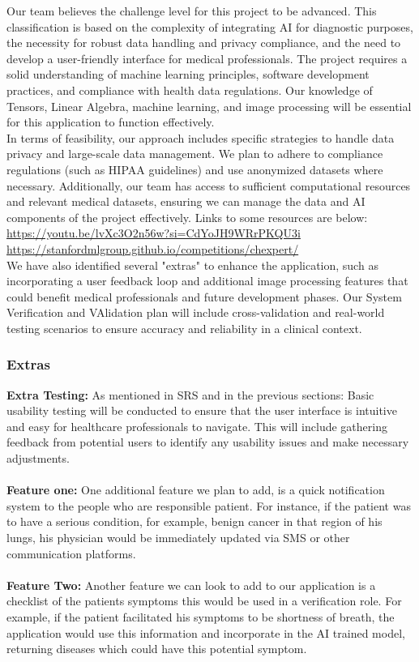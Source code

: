 \documentclass[12pt, titlepage]{article}
\begin{document}
Our team believes the challenge level for this project to be advanced. This classification is based on the complexity of integrating AI for diagnostic purposes, the necessity for robust data handling and privacy compliance, and the need to develop a user-friendly interface for medical professionals. The project requires a solid understanding of machine learning principles, software development practices, and compliance with health data regulations. Our knowledge of Tensors, Linear Algebra, machine learning, and image processing will be essential for this application to function effectively. \\
In terms of feasibility, our approach includes specific strategies to handle data privacy and large-scale data management. We plan to adhere to compliance regulations (such as HIPAA guidelines) and use anonymized datasets where necessary. Additionally, our team has access to sufficient computational resources and relevant medical datasets, ensuring we can manage the data and AI components of the project effectively. Links to some resources are below:\\
\url{https://youtu.be/lvXc3O2n56w?si=CdYoJH9WRrPKQU3i}
\url{https://stanfordmlgroup.github.io/competitions/chexpert/} \\ 
We have also identified several "extras" to enhance the application, such as incorporating a user feedback loop and additional image processing features that could benefit medical professionals and future development phases. Our System Verification and VAlidation plan will include cross-validation and real-world testing scenarios to ensure accuracy and reliability in a clinical context. \\
\subsubsection{Extras}

\textbf{Extra Testing:}
As mentioned in SRS and in the previous sections: Basic usability testing will be conducted to ensure that the user interface is intuitive and easy for healthcare professionals to navigate. This will include gathering feedback from potential users to identify any usability issues and make necessary adjustments. \\\\  
\textbf{Feature one:}
One additional feature we plan to add, is a quick notification system to the people who are responsible patient. For instance, if the patient was to have a serious condition, for example, benign cancer in that region of his lungs, his physician would be immediately updated via SMS or other communication platforms. \\\\  
\textbf{Feature Two:}
Another feature we can look to add to our application is a checklist of the patients symptoms this would be used in a verification role. For example, if the patient facilitated his symptoms to be shortness of breath, the application would use this information and incorporate in the AI trained model, returning diseases which could have this potential symptom.\\  
\end{document}
